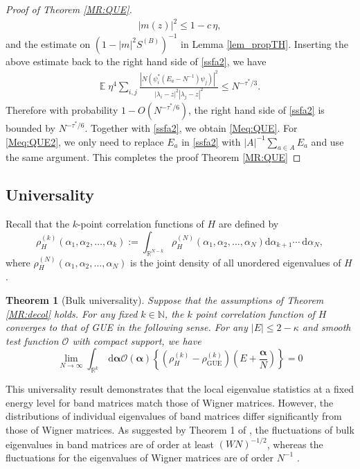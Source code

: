 \documentclass[10pt,reqno]{article}
\theoremstyle{plain} %
\newtheorem{theorem}{Theorem}[section]
\theoremstyle{remark}
\numberwithin{equation}{section}
\begin{document}
\begin{proof}[Proof of Theorem \ref{MR:QUE}]
\begin{align}\label{me}
|m(z)|^2 \le 1-c\,\eta, 
\end{align}
and the estimate on $(1-|m|^2 S^{(B)})^{-1}$ in  Lemma \ref{lem_propTH}.  Inserting the  above estimate back to the right hand side  of \eqref{ssfa2}, we have 
\begin{align}\label{que2}
\mathbb E \; \eta^4 \sum_{i, j  } \frac{ \left|N (\psi_i^*\left(E_a-N^{-1}\right) \psi_j)\right|^2}{\left|\lambda_i-z\right|^2\left|\lambda_j-z\right|^2}
 \le N^{- \tau ^* /3}.
\end{align}
 Therefore with probability $1-O(N^{- \tau ^* /6})$, the right hand side  of \eqref{ssfa2} is bounded by $N^{- \tau ^* /6}$. Together with \eqref{ssfa2}, we obtain \eqref{Meq:QUE}.  For \eqref{Meq:QUE2},  we  only need to replace $E_a$ in \eqref{ssfa2} with $|A|^{-1}\sum_{a\in A} E_a$ and use the same argument. This completes the proof Theorem \ref{MR:QUE}

\end{proof}


 \subsection{Universality} 
Recall that the $k$-point correlation functions  of $H$ are defined  by
\[
\rho_H^{(k)}\left(\alpha_1, \alpha_2, \ldots, \alpha_k\right):=\int_{\mathbb{R}^{N-k}} \rho_H^{(N)}\left(\alpha_1, \alpha_2, \ldots, \alpha_N\right) \mathrm{d} \alpha_{k+1} \cdots \mathrm{~d} \alpha_N, 
\]
where $\rho_H^{(N)}\left(\alpha_1, \alpha_2, \ldots, \alpha_N\right)$ is the joint density of all unordered eigenvalues of $H$. 

 \begin{theorem}[Bulk universality]\label{Thm: B_Univ}Suppose that  the assumptions of Theorem \ref{MR:decol} holds. For any fixed $k\in \mathbb N$, the $k$ point correlation function of $H$ converges to that of GUE in the following sense. For any $|E| \leq 2-\kappa$ and smooth test function $\mathcal{O}$ with compact support, we have
 \begin{equation}\label{eq:universality}
\lim _{N \rightarrow \infty} \int_{\mathbb{R}^k} \mathrm{~d} \boldsymbol{\alpha} \mathcal{O}(\boldsymbol{\alpha})\left\{\left(\rho_H^{(k)}-\rho_{\mathrm{GUE}}^{(k)}\right)\left(E+\frac{\boldsymbol{\alpha}}{N}\right)\right\}=0 
 \end{equation}  
 \end{theorem}

This universality result demonstrates that the local eigenvalue statistics at a fixed energy level for band matrices match those of Wigner matrices. However, the distributions of individual eigenvalues of band matrices differ significantly from those of Wigner matrices. As suggested by Theorem 1 of \cite{Sch2015}, the fluctuations of bulk eigenvalues in band matrices are of order at least $(WN)^{-1/2}$, whereas the fluctuations for the eigenvalues of Wigner matrices are of order $ N^{-1}$ \cite{erdHos2012rigidity}.
 
\end{document}
